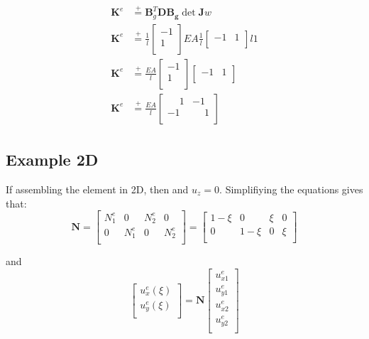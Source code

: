 \documentclass[10pt,b5paper,titlepage]{book}
\newcommand{\m}{\mathbf}
\newcommand*\eqp{\stackrel{+}{=}}
\newenvironment{eqarray}
{
    \begin{eqnarray}
        \begin{aligned}
}
{
        \end{aligned}
    \end{eqnarray}
}
\begin{document}
\begin{eqarray}
    \m{K}^e &\eqp \m{B}_g^T \m{D} \m{B_g} \det \m{J} w \\
    \m{K}^e &\eqp \frac{1}{l} \begin{bmatrix} -1 \\ 1 \\ \end{bmatrix}
                  EA
                  \frac{1}{l} \begin{bmatrix} -1 & 1 \\ \end{bmatrix}
                  l 1 \\
    \m{K}^e &\eqp \frac{EA}{l}
                  \begin{bmatrix} -1 \\ 1 \\ \end{bmatrix}
                  \begin{bmatrix} -1 & 1 \\ \end{bmatrix} \\
    \m{K}^e &\eqp \frac{EA}{l}
                  \begin{bmatrix}
                      \phantom{-}1 & -1 \\
                      -1 & \phantom{-}1 \\
                  \end{bmatrix}
\end{eqarray}


\subsection{Example 2D}
If assembling the element in 2D, then and $ u_z = 0 $.
Simplifiying the equations gives that:
\begin{equation}
    \m{N} = \begin{bmatrix}
        N_1^e & 0 & N_2^e & 0 \\
        0 & N_1^e & 0 & N_2^e \\
    \end{bmatrix}
    = \begin{bmatrix}
        1 - \xi & 0 & \xi & 0 \\
        0 & 1 - \xi & 0 & \xi \\
    \end{bmatrix}
\end{equation}

and
\begin{equation}
    \begin{bmatrix}
        u_x^e(\xi) \\
        u_y^e(\xi) \\
    \end{bmatrix}
    = \m{N} \begin{bmatrix}
        u_{x1}^e \\
        u_{y1}^e \\
        u_{x2}^e \\
        u_{y2}^e \\
    \end{bmatrix}
\end{equation}
\end{document}
